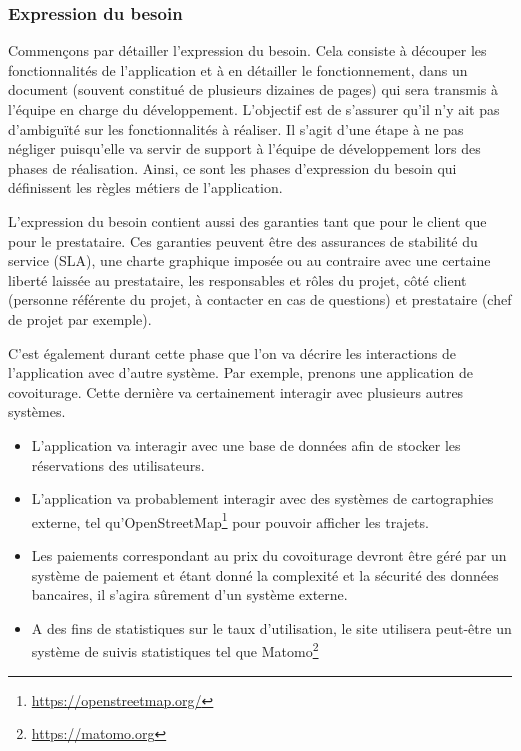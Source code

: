 \subsubsection{Expression du besoin}

Commençons par détailler l'expression du besoin. Cela consiste à découper les fonctionnalités de l'application et à en détailler le fonctionnement, dans un document (souvent constitué de plusieurs dizaines de pages) qui sera transmis à l'équipe en charge du développement. L'objectif est de s'assurer qu'il n'y ait pas d'ambiguïté sur les fonctionnalités à réaliser. Il s'agit d'une étape à ne pas négliger puisqu'elle va servir de support à l'équipe de développement lors des phases de réalisation. Ainsi, ce sont les phases d'expression du besoin qui définissent les règles métiers de l'application. 

L'expression du besoin contient aussi des garanties tant que pour le client que pour le prestataire. Ces garanties peuvent être des assurances de stabilité du service (\gls{SLA}), une charte graphique imposée ou au contraire avec une certaine liberté laissée au prestataire, les responsables et rôles du projet, côté client (personne référente du projet, à contacter en cas de questions) et prestataire (chef de projet par exemple).

C'est également durant cette phase que l'on va décrire les interactions de l'application avec d'autre système. Par exemple, prenons une application de covoiturage. Cette dernière va certainement interagir avec plusieurs autres systèmes.

\begin{itemize}
	\setlength\itemsep{0em}
	\item L'application va interagir avec une base de données afin de stocker les réservations des utilisateurs.
	\item L'application va probablement interagir avec des systèmes de cartographies externe, tel qu'OpenStreetMap\footnote{\url{https://openstreetmap.org/}} pour pouvoir afficher les trajets.
	\item Les paiements correspondant au prix du covoiturage devront être géré par un système de paiement et étant donné la complexité et la sécurité des données bancaires, il s'agira sûrement d'un système externe.
	\item A des fins de statistiques sur le taux d'utilisation, le site utilisera peut-être un système de suivis statistiques tel que Matomo\footnote{\url{https://matomo.org}} 
\end{itemize}

